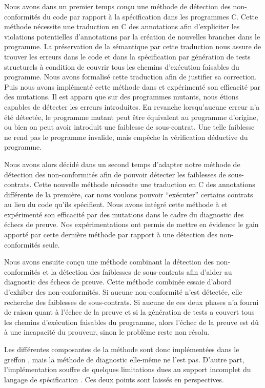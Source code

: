 Nous avons dans un premier temps conçu une méthode de détection des
non-conformités du code par rapport à la spécification dans les programmes C.
Cette méthode nécessite une traduction en C des annotations \acsl afin
d'expliciter les violations potentielles d'annotations par la création de
nouvelles branches dans le programme.
La préservation de la sémantique par cette traduction nous assure de trouver
les erreurs dans le code et dans la spécification par génération de tests
structurels à condition de couvrir tous les chemins d'exécution faisables du
programme.
Nous avons formalisé cette traduction afin de justifier sa correction.
Puis nous avons implémenté cette méthode dans \stady et expérimenté son
efficacité par des mutations.
Il est apparu que sur des programmes mutants, nous étions capables de détecter
les erreurs introduites.
En revanche lorsqu'aucune erreur n'a été détectée, le programme mutant peut
être équivalent au programme d'origine, ou bien on peut avoir introduit une
faiblesse de sous-contrat.
Une telle faiblesse ne rend pas le programme invalide, mais empêche la
vérification déductive du programme.

Nous avons alors décidé dans un second temps d'adapter notre méthode de
détection des non-conformités afin de pouvoir détecter les faiblesses de
sous-contrats.
Cette nouvelle méthode nécessite une traduction en C des annotations \acsl
différente de la première, car nous voulons pouvoir ``exécuter'' certains
contrats au lieu du code qu'ils spécifient.
Nous avons intégré cette méthode à \stady et expérimenté son efficacité par des
mutations dans le cadre du diagnostic des échecs de preuve.
Nos expérimentations ont permis de mettre en évidence le gain apporté par cette
dernière méthode par rapport à une détection des non-conformités seule.

Nous avons ensuite conçu une méthode combinant la détection des non-conformités
et la détection des faiblesses de sous-contrats afin d'aider au diagnostic des
échecs de preuve.
Cette méthode combinée essaie d'abord d'exhiber des non-conformités.
Si aucune non-conformité n'est détectée, elle recherche des faiblesses de
sous-contrats.
Si aucune de ces deux phases n'a fourni de raison quant à l'échec de la preuve
et si la génération de tests a couvert tous les chemins d'exécution faisables
du programme, alors l'échec de la preuve est dû à une incapacité du prouveur,
sinon le problème reste non résolu.

Les différentes composantes de la méthode sont donc implémentées dans le
greffon \stady, mais la méthode de diagnostic elle-même ne l'est pas.
D'autre part, l'implémentation souffre de quelques limitations dues au support
incomplet du langage de spécification \acsl.
Ces deux points sont laissés en perspectives.


